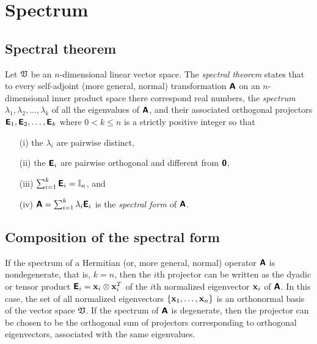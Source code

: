 \section{Spectrum}

\subsection{Spectral theorem}
\label{2012-m-ch-Spectraltheorem}

Let $\frak V$ be an $n$-dimensional linear vector space.
The {\em spectral theorem} states
that to every self-adjoint (more general, normal) transformation $ \textsf{\textbf{A}}$
on an $n$-dimensional inner product space there correspond real numbers, the {\em spectrum}
$
\lambda_1,
\lambda_2, \ldots ,
\lambda_k
$
of all the eigenvalues of   $ \textsf{\textbf{A}}$,
and their associated  orthogonal projectors
$
\textsf{\textbf{E}}_1,
\textsf{\textbf{E}}_2, \ldots ,
\textsf{\textbf{E}}_k
$
where $0<k\le n$ is a strictly positive integer so that
\begin{itemize}
\item[(i)]
the $\lambda_i$ are pairwise distinct,
\item[(ii)]
the $\textsf{\textbf{E}}_i$ are pairwise orthogonal and different from $\textsf{\textbf{0}}$,
\item[(iii)]
$\sum_{i=1}^k \textsf{\textbf{E}}_i={\Bbb I}_n$, and
\item[(iv)]
$
\textsf{\textbf{A}}=\sum_{i=1}^k \lambda_i\textsf{\textbf{E}}_i
$
is the {\em spectral form} of $\textsf{\textbf{A}}$.
\end{itemize}

\subsection{Composition of the spectral form}

If the spectrum of a  Hermitian (or, more general, normal) operator $\textsf{\textbf{A}}$ is nondegenerate, that is, $k=n$, then the
$i$th projector
can be written as the dyadic or tensor product $
\textsf{\textbf{E}}_i={\bf x}_i \otimes {\bf x}_i^T$
of the $i$th normalized eigenvector ${\bf x}_i $ of $\textsf{\textbf{A}}$.
In this case, the set of all normalized eigenvectors $\{{\bf x}_1, \ldots ,{\bf x}_n\}$ is an orthonormal basis of the vector space $\frak V$.
If the spectrum of $\textsf{\textbf{A}}$ is degenerate, then the projector can be chosen to be the orthogonal sum of projectors
corresponding to orthogonal eigenvectors, associated with the same  eigenvalues.

